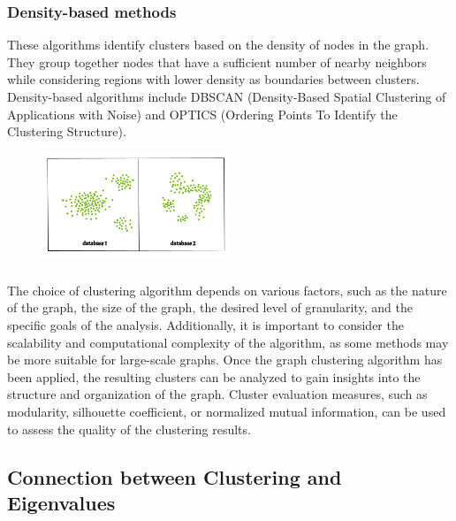 \documentclass[12pt, a4paper]{article}
\begin{document}
\begin{flushleft}
        \subsubsection{Density-based methods}
        \begin{flushleft}
             These algorithms identify clusters based on the density of nodes in the graph. They group together nodes that have a sufficient number of nearby neighbors while considering regions with lower density as boundaries between clusters. Density-based algorithms include DBSCAN (Density-Based Spatial Clustering of Applications with Noise) and OPTICS (Ordering Points To Identify the Clustering Structure).
            \begin{figure}[h]
            \centering
            \includegraphics[width=0.5\textwidth]{density_based.png}
            \end{figure}
        \end{flushleft}

        \subsubsection*{}
        \begin{flushleft}
        The choice of clustering algorithm depends on various factors, such as the nature of the graph, the size of the graph, the desired level of granularity, and the specific goals of the analysis. Additionally, it is important to consider the scalability and computational complexity of the algorithm, as some methods may be more suitable for large-scale graphs. Once the graph clustering algorithm has been applied, the resulting clusters can be analyzed to gain insights into the structure and organization of the graph. Cluster evaluation measures, such as modularity, silhouette coefficient, or normalized mutual information, can be used to assess the quality of the clustering results.
        \end{flushleft} 

        \subsection{Connection between Clustering and Eigenvalues}


\end{flushleft}
\end{document}
